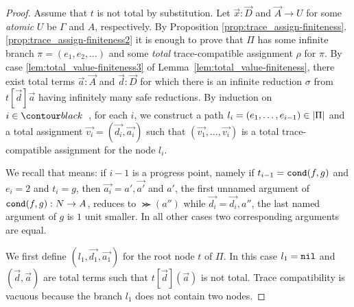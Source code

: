 \begin{proof}
  Assume that $t$ is not total by substitution. 
  Let $\vec{x}:\vec{D}$ and $\vec{A}\rightarrow U$ for some \emph{atomic} $U$ 
 be $\Gamma$ and $A$, respectively.
  By Proposition \ref{prop:trace_assign-finiteness}.\ref{prop:trace_assign-finiteness2} it is enough to prove that
  $\Pi$ has some infinite branch $\pi=(e_1, e_2, \ldots)$ 
  and some \emph{total} trace-compatible assignment $\rho$ for $\pi$.
  By case \ref{lem:total_value-finiteness3} of Lemma~\ref{lem:total_value-finiteness},
  there exist total terms $\vec{a}:\vec{A}$ and $\vec{d}:\vec{D}$ for which there is
  an infinite reduction $\sigma$ from $t[\vec{d}]\vec{a}$ having infinitely many safe reductions.
  By induction on $i \in \Nat$, for each $i$, we construct a path 
  $l_i = (e_1,\ldots,e_{i-1}) \in {|\Pi|}$
  and a total assignment $\vec{v_i} = (\vec{d_i},\vec{a_i})$ such that
  $(\vec{v_1},\ldots,\vec{v_i})$ is a total trace-compatible assignment for the node $l_i$. 

  
 We recall that  means: 
 if $i-1$ is a progress point, namely if $t_{i-1}={\tt cond}(f,g)$ and $e_i=2$ 
    and $t_i=g$,
    then $\vec{a_i} = a',\vec{a'}$ 
    and $a'$, the first unnamed argument of ${\tt cond}(f,g):{N} \rightarrow A$, reduces to $\Succ(a'')$
     while $\vec{d_i} = \vec{d_i},a''$, 
     the last named argument of $g$ is $1$ unit smaller.
  In all other cases two corresponding arguments are equal.

  We first define $(l_1,\vec{d_1},\vec{a_1})$ for the root node $t$ of $\Pi$.
  In this case $l_1 = {\tt nil}$ 
   and $(\vec{d},\vec{a})$ are total terms such that $t[\vec{d}](\vec{a})$ is not total.
  Trace compatibility is vacuous because the branch $l_1$ does not contain two nodes.


\end{proof}
